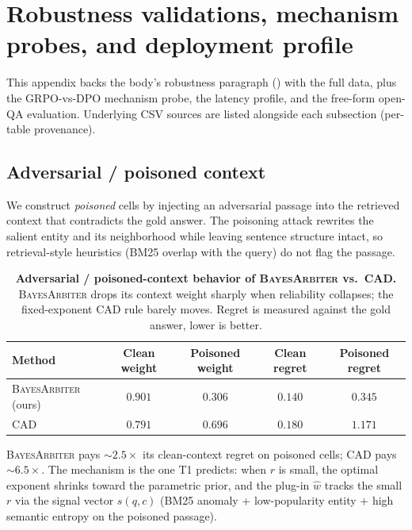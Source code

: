\section{Robustness validations, mechanism probes, and deployment profile}
\label{app:robustness-validations}

This appendix backs the body's robustness paragraph
() with the full data, plus the
GRPO-vs-DPO mechanism probe, the latency profile, and the free-form
open-QA evaluation.  Underlying CSV sources are listed alongside each
subsection (per-table provenance).

\subsection{Adversarial / poisoned context}
\label{app:adversarial-context}

We construct \emph{poisoned} cells by injecting an adversarial passage
into the retrieved context that contradicts the gold answer.  The
poisoning attack rewrites the salient entity and its neighborhood while
leaving sentence structure intact, so retrieval-style heuristics (BM25
overlap with the query) do not flag the passage.

\begin{table}[H]
\centering\small
\caption{\textbf{Adversarial / poisoned-context behavior of \textsc{BayesArbiter}
vs.\ CAD.} \textsc{BayesArbiter} drops its context weight
sharply when reliability collapses; the fixed-exponent CAD rule barely
moves.  Regret is measured against the gold answer, lower is better.}
\label{tab:adversarial-context}
\setlength{\tabcolsep}{6pt}
\begin{tabular}{lcccc}
\toprule
\textbf{Method} & \textbf{Clean weight} & \textbf{Poisoned weight} & \textbf{Clean regret} & \textbf{Poisoned regret}\\
\midrule
\textsc{BayesArbiter} (ours) & $0.901$ & $\mathbf{0.306}$ & $0.140$ & $\mathbf{0.345}$\\
CAD                  & $0.791$ & $0.696$          & $0.180$ & $1.171$\\
\bottomrule
\end{tabular}
\end{table}

\textsc{BayesArbiter} pays $\sim\!2.5\!\times$ its clean-context regret on
poisoned cells; CAD pays $\sim\!6.5\!\times$.  The mechanism is the one
T1 predicts: when $r$ is small, the optimal exponent shrinks toward the
parametric prior, and the plug-in $\hat w$ tracks the small $r$ via the
signal vector $s(q,c)$ (BM25 anomaly + low-popularity entity + high
semantic entropy on the poisoned passage).

